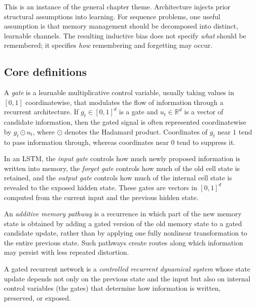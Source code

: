 \medskip

This is an instance of the general chapter theme.
Architecture injects prior structural assumptions into learning.
For sequence problems, one useful assumption is that memory management should be decomposed into distinct, learnable channels.
The resulting inductive bias does not specify \emph{what} should be remembered; it specifies \emph{how} remembering and forgetting may occur.

\subsection*{Core definitions}

\begin{definition}[Gate]
A \emph{gate} is a learnable multiplicative control variable, usually taking values in $[0,1]$ coordinatewise, that modulates the flow of information through a recurrent architecture.
If $g_t \in [0,1]^d$ is a gate and $u_t \in \mathbb{R}^d$ is a vector of candidate information, then the gated signal is often represented coordinatewise by $g_t \odot u_t$, where $\odot$ denotes the Hadamard product.
Coordinates of $g_t$ near $1$ tend to pass information through, whereas coordinates near $0$ tend to suppress it.
\end{definition}

\begin{definition}
In an LSTM, the \emph{input gate} controls how much newly proposed information is written into memory, the \emph{forget gate} controls how much of the old cell state is retained, and the \emph{output gate} controls how much of the internal cell state is revealed to the exposed hidden state.
These gates are vectors in $[0,1]^d$ computed from the current input and the previous hidden state.
\end{definition}

\begin{definition}
An \emph{additive memory pathway} is a recurrence in which part of the new memory state is obtained by adding a gated version of the old memory state to a gated candidate update, rather than by applying one fully nonlinear transformation to the entire previous state.
Such pathways create routes along which information may persist with less repeated distortion.
\end{definition}

\begin{definition}
A gated recurrent network is a \emph{controlled recurrent dynamical system} whose state update depends not only on the previous state and the input but also on internal control variables (the gates) that determine how information is written, preserved, or exposed.
\end{definition}

